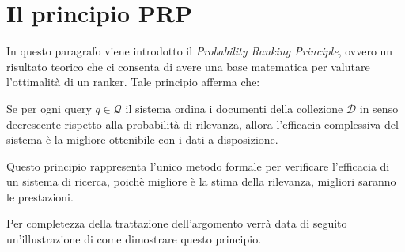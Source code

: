 \section{Il principio PRP}

In questo paragrafo viene introdotto il \textit{Probability Ranking Principle}, ovvero un risultato
teorico che ci consenta di avere una base matematica per valutare l'ottimalità di un ranker.
Tale principio afferma che:

\begin{definizione}\label{def:prp}
	Se per ogni query $q \in \mathcal{Q}$ il sistema ordina i documenti della collezione $\mathcal{D}$ in
	senso decrescente rispetto alla probabilità di rilevanza, allora l'efficacia complessiva del sistema
	è la migliore ottenibile con i dati a disposizione.
\end{definizione}

Questo principio rappresenta l'unico metodo formale per verificare l'efficacia di un sistema
di ricerca, poichè migliore è la stima della rilevanza, migliori saranno le prestazioni.

Per completezza della trattazione dell'argomento verrà data di seguito
un'illustrazione di come dimostrare questo principio.

